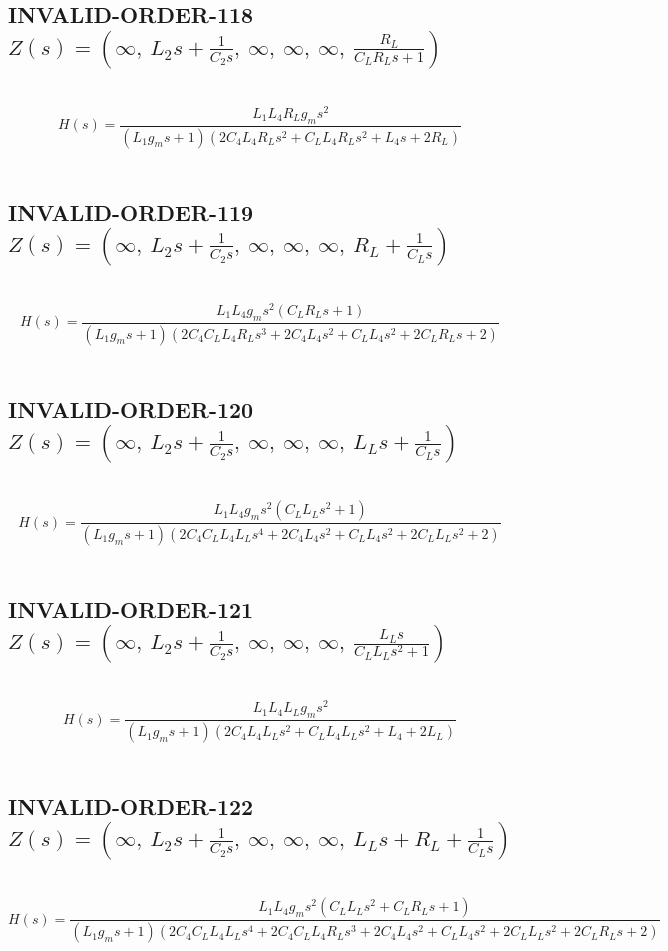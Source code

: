 \documentclass{article}
\begin{document}
\subsection{INVALID-ORDER-118 $Z(s) = \left( \infty, \  L_{2} s + \frac{1}{C_{2} s}, \  \infty, \  \infty, \  \infty, \  \frac{R_{L}}{C_{L} R_{L} s + 1}\right)$ } \ 
\textbf{\[H(s) = \frac{L_{1} L_{4} R_{L} g_{m} s^{2}}{\left(L_{1} g_{m} s + 1\right) \left(2 C_{4} L_{4} R_{L} s^{2} + C_{L} L_{4} R_{L} s^{2} + L_{4} s + 2 R_{L}\right)}\] } \ 
\subsection{INVALID-ORDER-119 $Z(s) = \left( \infty, \  L_{2} s + \frac{1}{C_{2} s}, \  \infty, \  \infty, \  \infty, \  R_{L} + \frac{1}{C_{L} s}\right)$ } \ 
\textbf{\[H(s) = \frac{L_{1} L_{4} g_{m} s^{2} \left(C_{L} R_{L} s + 1\right)}{\left(L_{1} g_{m} s + 1\right) \left(2 C_{4} C_{L} L_{4} R_{L} s^{3} + 2 C_{4} L_{4} s^{2} + C_{L} L_{4} s^{2} + 2 C_{L} R_{L} s + 2\right)}\] } \ 
\subsection{INVALID-ORDER-120 $Z(s) = \left( \infty, \  L_{2} s + \frac{1}{C_{2} s}, \  \infty, \  \infty, \  \infty, \  L_{L} s + \frac{1}{C_{L} s}\right)$ } \ 
\textbf{\[H(s) = \frac{L_{1} L_{4} g_{m} s^{2} \left(C_{L} L_{L} s^{2} + 1\right)}{\left(L_{1} g_{m} s + 1\right) \left(2 C_{4} C_{L} L_{4} L_{L} s^{4} + 2 C_{4} L_{4} s^{2} + C_{L} L_{4} s^{2} + 2 C_{L} L_{L} s^{2} + 2\right)}\] } \ 
\subsection{INVALID-ORDER-121 $Z(s) = \left( \infty, \  L_{2} s + \frac{1}{C_{2} s}, \  \infty, \  \infty, \  \infty, \  \frac{L_{L} s}{C_{L} L_{L} s^{2} + 1}\right)$ } \ 
\textbf{\[H(s) = \frac{L_{1} L_{4} L_{L} g_{m} s^{2}}{\left(L_{1} g_{m} s + 1\right) \left(2 C_{4} L_{4} L_{L} s^{2} + C_{L} L_{4} L_{L} s^{2} + L_{4} + 2 L_{L}\right)}\] } \ 
\subsection{INVALID-ORDER-122 $Z(s) = \left( \infty, \  L_{2} s + \frac{1}{C_{2} s}, \  \infty, \  \infty, \  \infty, \  L_{L} s + R_{L} + \frac{1}{C_{L} s}\right)$ } \ 
\textbf{\[H(s) = \frac{L_{1} L_{4} g_{m} s^{2} \left(C_{L} L_{L} s^{2} + C_{L} R_{L} s + 1\right)}{\left(L_{1} g_{m} s + 1\right) \left(2 C_{4} C_{L} L_{4} L_{L} s^{4} + 2 C_{4} C_{L} L_{4} R_{L} s^{3} + 2 C_{4} L_{4} s^{2} + C_{L} L_{4} s^{2} + 2 C_{L} L_{L} s^{2} + 2 C_{L} R_{L} s + 2\right)}\] } \ 
\end{document}
